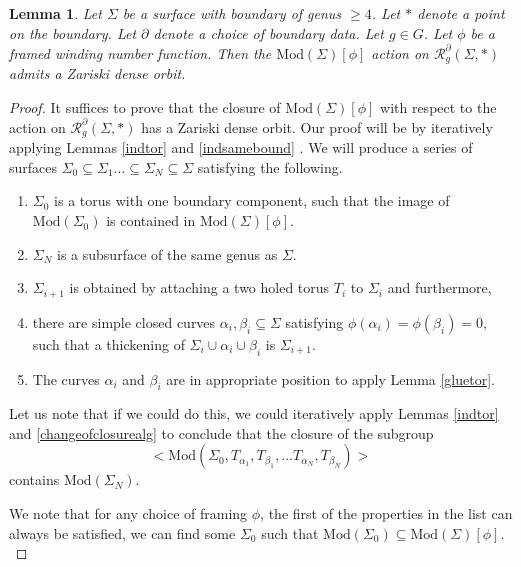 \documentclass{article}
\newcommand{\Rc}{\mathcal{R}}
\newcommand{\Mod}{\textrm{Mod}}
\newtheorem{lemma}{Lemma}[theorem]
\begin{document}
\begin{lemma}\label{framedense}
    Let $\Sigma$ be a surface with boundary of genus $ \ge 4$. Let $*$ denote a point on the boundary. Let $\partial$ denote a choice of boundary data. Let $g \in G$. Let $\phi$ be a framed winding number function. Then the $\Mod(\Sigma)[\phi]$ action on  $\Rc^{\partial}_g(\Sigma, *)$ admits a Zariski dense orbit.
\end{lemma}
\begin{proof}
It suffices to prove that the closure of $\Mod(\Sigma)[\phi]$ with respect to the action on $\Rc^{\partial}_g(\Sigma, *)$ has a Zariski dense orbit.
Our proof will be by iteratively applying Lemmas \ref{indtor} and \ref{indsamebound} . We will produce a series of surfaces $\Sigma_0 \subseteq  \Sigma_1 \dots \subseteq \Sigma_N \subseteq \Sigma$ satisfying the following.
\begin{enumerate}
   \item $\Sigma_0$ is a torus with one boundary component, such that the image of $\Mod(\Sigma_0)$ is contained in $\Mod(\Sigma)[\phi].$
    \item $\Sigma_N$ is a subsurface of the same genus as $\Sigma$.
    \item $\Sigma_{i+1}$ is obtained by attaching a two holed torus $T_i$ to $\Sigma_i$ and furthermore,
    \item there are simple closed curves $\alpha_i, \beta_i \subseteq \Sigma$ satisfying $\phi(\alpha_i) = \phi(\beta_i) =0,$ such that a thickening of $\Sigma_i \cup \alpha_i \cup \beta_i$ is $\Sigma_{i+1}.$
    \item The curves $\alpha_i$ and $\beta_i$ are in appropriate position to apply Lemma \ref{gluetor}.

\end{enumerate}
Let us note that if we could do this, we could iteratively apply Lemmas \ref{indtor} and \ref{changeofclosurealg} to conclude that  the closure of the subgroup $$<\Mod(\Sigma_0, T_{\alpha_1}, T_{\beta_1}, \dots T_{\alpha_N}, T_{\beta_N})>$$ contains $\Mod(\Sigma_N).$


 We note that for any choice of framing $\phi$, the first of the  properties in the list can always be satisfied, we can find some $\Sigma_0$ such that $\Mod(\Sigma_0) \subseteq \Mod(\Sigma)[\phi].$


\end{proof}
\end{document}
